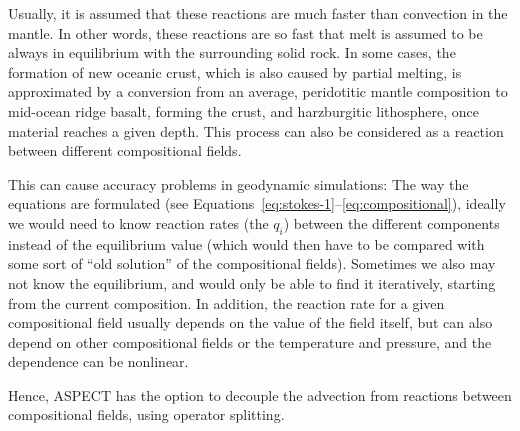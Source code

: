 \documentclass{article}
\newcommand{\aspect}{\textsc{ASPECT}}
\begin{document}
Usually, it is assumed that these reactions are much faster than convection in the mantle. In other words, these reactions are so fast that melt is assumed to be always in equilibrium with the surrounding solid rock. In some cases, the formation of new oceanic crust, which is also caused by partial melting, is approximated by a conversion from an average, peridotitic mantle composition to mid-ocean ridge basalt, forming the crust, and harzburgitic lithosphere, once material reaches a given depth. This process can also be considered as a reaction between different compositional fields. 

This can cause accuracy problems in geodynamic simulations: The way the equations are formulated (see Equations~\ref{eq:stokes-1}--\ref{eq:compositional}), ideally we would need to know reaction rates (the $q_i$) between the different components instead of the equilibrium value (which would then have to be compared with some sort of ``old solution'' of the compositional fields). Sometimes we also may not know the equilibrium, and would only be able to find it iteratively, starting from the current composition. In addition, the reaction rate for a given compositional field usually depends on the value of the field itself, but can also depend on other compositional fields or the temperature and pressure, and the dependence can be nonlinear.

Hence, \aspect{} has the option to decouple the advection from reactions between compositional fields, using operator splitting.
\end{document}
